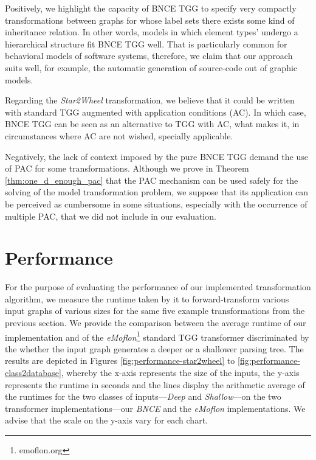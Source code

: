 Positively, we highlight the capacity of BNCE TGG to specify very compactly transformations between graphs for whose label sets there exists some kind of inheritance relation. In other words, models in which element types' undergo a hierarchical structure fit BNCE TGG well. That is particularly common for behavioral models of software systems, therefore, we claim that our approach suits well, for example, the automatic generation of source-code out of graphic models.

Regarding the \emph{Star2Wheel} transformation, we believe that it could be written with standard TGG augmented with application conditions (AC). In which case, BNCE TGG can be seen as an alternative to TGG with AC, what makes it, in circumstances where AC are not wished, specially applicable.

Negatively, the lack of context imposed by the pure BNCE TGG demand the use of PAC for some transformations. Although we prove in Theorem \ref{thm:one_d_enough_pac} that the PAC mechanism can be used safely for the solving of the model transformation problem, we suppose that its application can be perceived as cumbersome in some situations, especially with the occurrence of multiple PAC, that we did not include in our evaluation.

\section{Performance}
\label{sec:eval-performance}
For the purpose of evaluating the performance of our implemented transformation algorithm, we measure the runtime taken by it to forward-transform various input graphs of various sizes for the same five example transformations from the previous section. We provide the comparison between the average runtime of our implementation and of the \emph{eMoflon}\footnote{emoflon.org} standard TGG transformer \cite{leblebici2014developing} discriminated by the whether the input graph generates a deeper or a shallower parsing tree. The results are depicted in Figures \ref{fig:performance-star2wheel} to \ref{fig:performance-class2database}, whereby the x-axis represents the size of the inputs, the y-axis represents the runtime in seconds and the lines display the arithmetic average of the runtimes for the two classes of inputs---\emph{Deep} and \emph{Shallow}---on the two transformer implementations---our \emph{BNCE} and the \emph{eMoflon} implementations. We advise that the scale on the y-axis vary for each chart.

